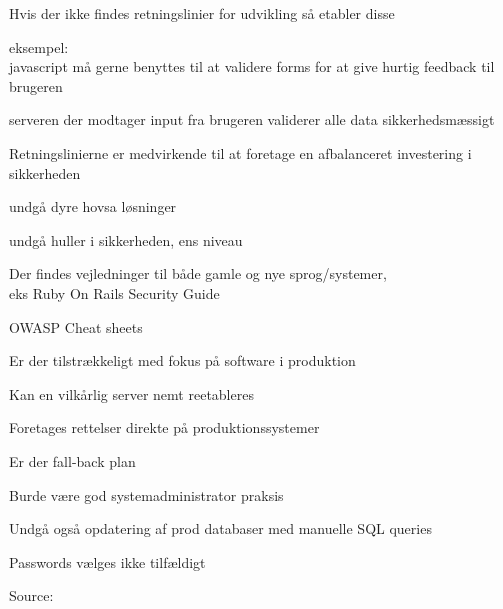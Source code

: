 \documentclass[Screen16to9,17pt]{foils}
\begin{document}

\begin{list2}
\item Hvis der ikke findes retningslinier for udvikling så etabler disse
\item eksempel:\\
javascript må gerne benyttes til at validere forms for at give hurtig
feedback til brugeren
\item serveren der modtager input fra brugeren validerer alle data
  sikkerhedsmæssigt
\item Retningslinierne er medvirkende til at foretage
en afbalanceret investering i sikkerheden
\item undgå dyre hovsa løsninger
\item undgå huller i sikkerheden, ens niveau

\item Der findes vejledninger til både gamle og nye sprog/systemer, \\
eks Ruby On Rails Security Guide\\

\item OWASP Cheat sheets\\
\end{list2}




\begin{list1}
\item Er der tilstrækkeligt med fokus på software i produktion
\item Kan en vilkårlig server nemt reetableres
\item Foretages rettelser direkte på produktionssystemer
\item Er der fall-back plan
\item Burde være god systemadministrator praksis
\vskip 2cm
\item Undgå også opdatering af prod databaser med manuelle SQL queries
\end{list1}




Passwords vælges ikke tilfældigt


Source:
\end{document}
